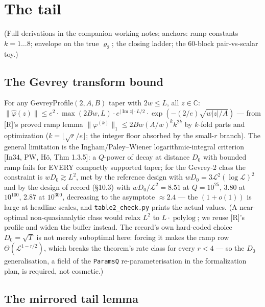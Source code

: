 \documentclass[11pt]{amsart}
\newcommand{\im}{\operatorname{Im}}
\theoremstyle{plain}
\theoremstyle{remark}
\begin{document}
\section{The tail}

(Full derivations in the companion working notes; anchors: ramp constants
$k = 1\dots8$; envelope on the true $\varrho_2$; the closing ladder; the 60-block
pair-vs-scalar toy.)

\subsection{The Gevrey transform bound}

For any GevreyProfile$(2, A, B)$ taper with $2w \le L$, all $z \in \mathbb{C}$:
$\lVert\widehat{\varphi}(z)\rVert \le e^2\cdot\max(2Bw, L)\cdot e^{|\im z|\cdot L/2}
\cdot\exp(-(2/e)\sqrt{w|z|/A})$ --- from [R]'s proved ramp lemma
$\lVert\varphi^{(k)}\rVert_1 \le 2Bw(A/w)^k k^{2k}$ by $k$-fold parts and
optimization ($k = \lfloor\sqrt{r}/e\rfloor$; the integer floor absorbed by the
small-$r$ branch). The general limitation is the Ingham/Paley--Wiener
logarithmic-integral criterion [In34, PW, H\"o, Thm 1.3.5]: a $Q$-power of decay at
distance $D_0$ with bounded ramp fails for EVERY compactly supported taper; for the
Gevrey-2 class the constraint is $wD_0 \gtrsim L^2$, met by the reference design with
$wD_0 = 3\mathcal{L}^2(\log \mathcal{L})^2$ and by the design of record (\S10.3) with
$wD_0/\mathcal{L}^2 = 8.51$ at $Q = 10^{25}$, 3.80 at $10^{100}$, 2.87 at $10^{300}$,
decreasing to the asymptote $\approx 2.4$ --- the $(1 + o(1))$ is large at headline
scales, and \texttt{table2\_check.py} prints the actual values. (A near-optimal
non-quasianalytic class would relax $L^2$ to $L\cdot\operatorname{polylog}$; we reuse
[R]'s profile and widen the buffer instead. The record's own hard-coded choice
$D_0 = \sqrt{T}$ is not merely suboptimal here: forcing it makes the ramp row
$\Theta(\mathcal{L}^{1-r/2})$, which breaks the theorem's rate class for every
$r < 4$ --- so the $D_0$ generalisation, a field of the \texttt{ParamsQ}
re-parameterisation in the formalization plan, is required, not cosmetic.)

\subsection{The mirrored tail lemma}
\end{document}

